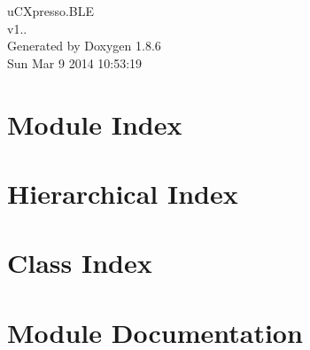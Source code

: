 \documentclass[twoside]{book}
\newcommand{\clearemptydoublepage}{%
  \newpage{\pagestyle{empty}\cleardoublepage}%
}
\begin{document}
\hypersetup{pageanchor=false}
\begin{titlepage}
\vspace*{7cm}
\begin{center}%
{\Large u\-C\-Xpresso.\-B\-L\-E \\[1ex]\large v1.. }\\
\vspace*{1cm}
{\large Generated by Doxygen 1.8.6}\\
\vspace*{0.5cm}
{\small Sun Mar 9 2014 10:53:19}\\
\end{center}
\end{titlepage}
\clearemptydoublepage
\tableofcontents
\clearemptydoublepage
{}
\hypersetup{pageanchor=true}

\chapter{Module Index}

\chapter{Hierarchical Index}

\chapter{Class Index}

\chapter{Module Documentation}



\end{document}
